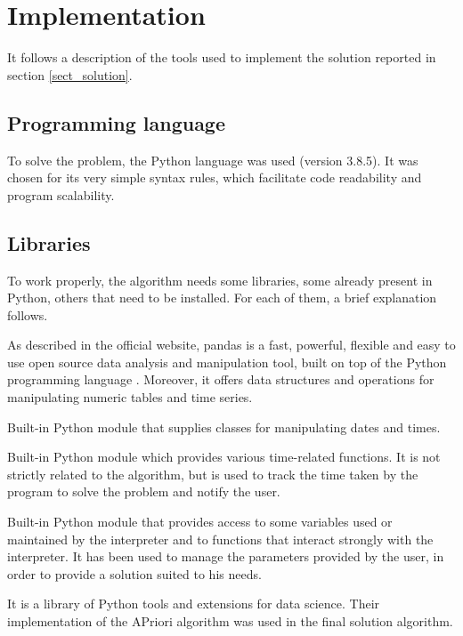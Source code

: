 
\section{Implementation}\label{sect_impl}
It follows a description of the tools used to implement the solution reported in section \ref{sect_solution}.

\subsection*{Programming language}
To solve the problem, the Python language was used (version 3.8.5). It was chosen for its very simple syntax rules, which facilitate code readability and program scalability.

\subsection*{Libraries}
To work properly, the algorithm needs some libraries, some already present in Python, others that need to be installed. For each of them, a brief explanation follows.

\vspace{2mm}
 As described in the official website, pandas is a fast, powerful, flexible and easy to use open source data analysis and manipulation tool, built on top of the Python programming language \cite{pandas}. Moreover, it offers data structures and operations for manipulating numeric tables and time series.

\vspace{2mm}
 Built-in Python module that supplies classes for manipulating dates and times.

\vspace{2mm}
 Built-in Python module which provides various time-related functions. It is not strictly related to the algorithm, but is used to track the time taken by the program to solve the problem and notify the user.

\vspace{2mm}
 Built-in Python module that provides access to some variables used or maintained by the interpreter and to functions that interact strongly with the interpreter. It has been used to manage the parameters provided by the user, in order to provide a solution suited to his needs.

\vspace{2mm}
 It is a library of Python tools and extensions for data science. Their implementation of the APriori algorithm was used in the final solution algorithm.

